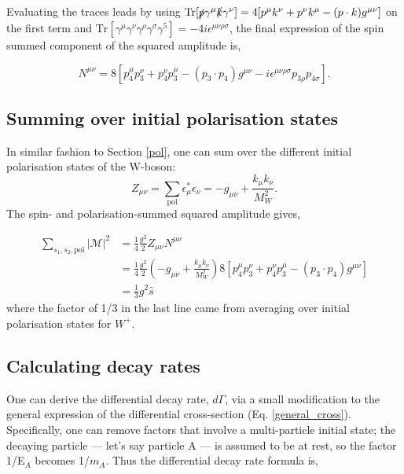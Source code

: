 \documentclass[a4paper,11pt]{article}
\begin{document}
  
 Evaluating the traces leads by using $ \text{Tr}[\slashed{p}\gamma^\mu \slashed{k} \gamma^\nu] = 4[p^\mu k^\nu + p^\nu k^\mu - (p \cdot k) g^{\mu \nu}]$ on the first term and $\text{Tr}[\gamma^\mu \gamma^\nu \gamma^\rho \gamma^\sigma \gamma^5] = -4i\epsilon^{\mu \nu \rho \sigma}$, the final expression of the spin summed component of the squared amplitude is,
 
 $$
 N^{\mu\nu}= 8[p_4^\mu p_3^\nu + p_4^\nu p_3^\mu - (p_3 \cdot p_4) g^{\mu \nu} -i \epsilon^{\mu \nu \rho \sigma}p_{3\rho}p_{4\sigma}].
 $$
 
 \subsection{Summing over initial polarisation states}
 In similar fashion to Section \ref{pol}, one can sum over the different initial polarisation states of the W-boson:
 \begin{equation}
 	Z_{\mu\nu}= \sum_\text{pol} \epsilon_\mu^* \epsilon_\nu=  -g_{\mu\nu} + \frac{k_\mu k_\nu}{M_W^2}.
 \end{equation}
The spin- and  polarisation-summed squared amplitude gives,

\begin{equation}
	\begin{aligned}
			\sum_{s_1, s_2, \text{pol}}|\mathcal{M}|^2&=  \frac{1}{4} \frac{g^2}{2} Z_{\mu\nu}N^{\mu\nu}\\
			&= \frac{1}{4} \frac{g^2}{2}   \left(-g_{\mu\nu} + \frac{k_\mu k_\nu}{M_W^2}\right) 8[p_4^\mu p_3^\nu + p_4^\nu p_3^\mu - (p_3 \cdot p_4) g^{\mu \nu}]\\
			&= \frac{1}{3}g^2 \hat{s}
	\end{aligned}
\end{equation}
where the factor of 1/3 in the last line came from averaging over initial polarisation states for $W^+.$




\subsection{Calculating decay rates}
One can derive the differential decay rate, $d \Gamma$, via a small modification to the general expression of the differential cross-section (Eq. \ref{general_cross}). Specifically, one can remove factors that involve a multi-particle initial state; the decaying particle --- let's say particle A --- is assumed to be at rest, so the factor 1/E$_A$ becomes 1/$m_A$. Thus the differential decay rate formula is,
\end{document}
